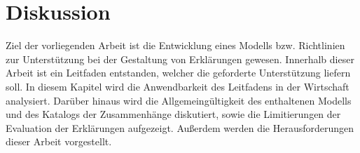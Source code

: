 \chapter{Diskussion}

Ziel der vorliegenden Arbeit ist die Entwicklung eines Modells bzw. Richtlinien zur Unterstützung bei der Gestaltung von Erklärungen gewesen. Innerhalb dieser Arbeit ist ein Leitfaden entstanden, welcher die geforderte Unterstützung liefern soll. In diesem Kapitel wird die Anwendbarkeit des Leitfadens in der Wirtschaft analysiert. Darüber hinaus wird die Allgemeingültigkeit des enthaltenen Modells und des Katalogs der Zusammenhänge diskutiert, sowie die Limitierungen der Evaluation der Erklärungen aufgezeigt. Außerdem werden die Herausforderungen dieser Arbeit vorgestellt.





